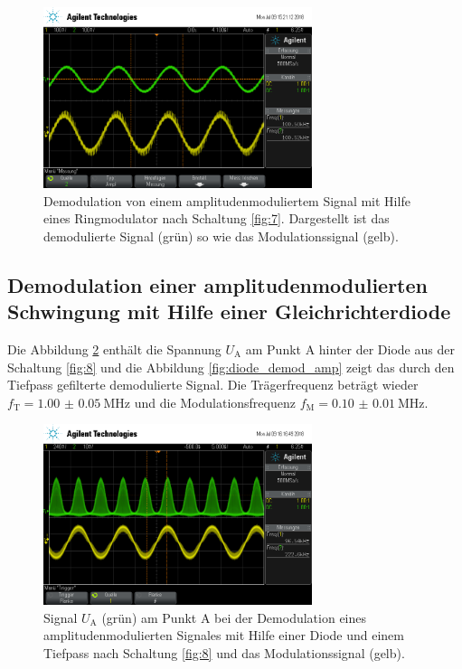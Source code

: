 \begin{figure}
  \centering
  \includegraphics[width=0.7\textwidth]{osci/amp_demod.png}
  \caption{Demodulation von einem amplitudenmoduliertem Signal mit Hilfe eines
  Ringmodulator nach Schaltung \ref{fig:7}. Dargestellt ist das demodulierte Signal (grün) so wie das Modulationssignal (gelb).}
  \label{fig:amp_demod_ring}
\end{figure}




\FloatBarrier
\subsection{Demodulation einer amplitudenmodulierten Schwingung
mit Hilfe einer Gleichrichterdiode}
\label{subsubsec:auswertung_g}
Die Abbildung \ref{fig:diode_punkt_A} enthält
die Spannung $U_{\text{A}}$ am Punkt A hinter der Diode aus der
Schaltung \ref{fig:8} und die Abbildung \ref{fig:diode_demod_amp}
zeigt das durch den Tiefpass gefilterte demodulierte Signal.
Die Trägerfrequenz beträgt wieder $f_{\text{T}}=\SI{1.00(5)}{\mega\hertz}$
und die Modulationsfrequenz $f_{\text{M}}=\SI{0.10(1)}{\mega\hertz}$.


\begin{figure}
  \centering
  \includegraphics[width=0.7\textwidth]{osci/amp_demod_diode_A.png}
  \caption{Signal $U_{\text{A}}$ (grün) am Punkt A bei der Demodulation eines amplitudenmodulierten Signales mit Hilfe einer
  Diode und einem Tiefpass nach Schaltung \ref{fig:8} und das Modulationssignal (gelb).}
  \label{fig:diode_punkt_A}
\end{figure}


